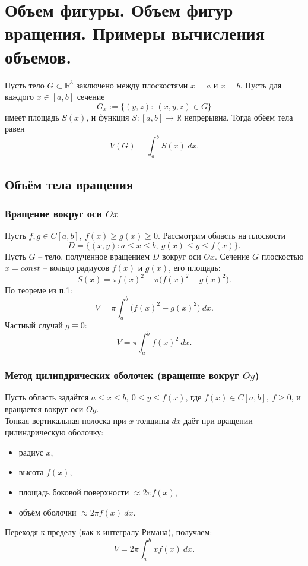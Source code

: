 \documentclass[14pt]{extreport}
\begin{document}
    \chapter{Объем фигуры. Объем фигур вращения. Примеры вычисления объемов.}

    \begin{theorem}
        Пусть тело $G \subset \mathbb{R}^3$ заключено между плоскостями $x=a$ и $x=b$. Пусть для каждого $x \in [a,b]$ сечение
        \[
        G_x := \{ (y,z):\ (x,y,z) \in G \}
        \]
        имеет площадь $S(x)$, и функция $S: [a,b] \rightarrow \mathbb{R}$ непрерывна. Тогда обёем тела равен
        \[
        V(G) = \int_a^b S(x)\ dx.
        \]
    \end{theorem}

    \section{Объём тела вращения}
    \subsection{Вращение вокруг оси $Ox$}
    Пусть $f,g \in C[a,b],\ f(x) \geq g(x) \geq 0$. Рассмотрим область на плоскости
    \[
    D = \{ (x,y): a \leq x \leq b,\ g(x) \leq y \leq f(x) \}.
    \]
    Пусть $G$ – тело, полученное вращением $D$ вокруг оси $Ox$. Сечение $G$ плоскостью $x=const$ – кольцо радиусов $f(x)$ и $g(x)$, его площадь:
    \[
    S(x) = \pi f(x)^2 - \pi \bigl( f(x)^2 - g(x)^2 \bigr).
    \]
    По теореме из п.1:
    \[
    V = \pi \int_a^b \bigl( f(x)^2 - g(x)^2 \bigr)\ dx.
    \]
    Частный случай $g \equiv 0$:
    \[
    V = \pi \int_a^b f(x)^2\ dx.
    \]

    \subsection{Метод цилиндрических оболочек (вращение вокруг $Oy$)}
    Пусть область задаётся $a \leq x \leq b,\ 0 \leq y \leq f(x)$, где $f(x) \in C[a,b],\ f \geq 0$, и вращается вокруг оси $Oy$.\\
    Тонкая вертикальная полоска при $x$ толщины $dx$ даёт при вращении цилиндрическую оболочку:
    \begin{itemize}
        \item радиус $x$,
        \item высота $f(x)$,
        \item площадь боковой поверхности $\approx 2\pi f(x)$,
        \item объём оболочки $\approx 2\pi f(x)\ dx$.
    \end{itemize}
    Переходя к пределу (как к интегралу Римана), получаем:
    \[
    V = 2\pi \int_a^b x f(x)\ dx.
    \]
\end{document}
